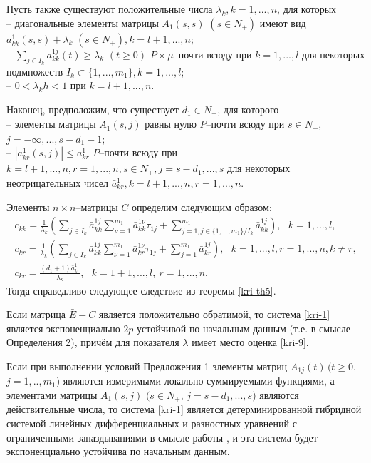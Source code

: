 Пусть также существуют положительные числа $\lambda _k, k = 1, ...,
n$, для которых\\
\noindent
-- диагональные элементы
матрицы $ A_1(s,s)$ $(s \in N_+)$ имеют вид $a_{kk}^{1}(s,s) +
\lambda _k \,\, (s \in N_+), k=l + 1, ..., n$;\\
--  $\sum \limits_{j\in I_k}a^{1j}_{kk}(t)
\geq \lambda _k \,\, (t\geq 0)$ $P\times\mu$--почти всюду при $k =
1,...,l$ для некоторых подмножеств $I_k \subset \{1,..., m_1\}, k =
1,..., l$;\\
-- $0 < \lambda _kh < 1$ при $ k
= l + 1, ..., n$.

Наконец, предположим, что существует $d_1 \in N_+$, для которого\\
\noindent
  -- элементы матрицы $A_1(s,j)$ равны нулю $P$--почти всюду
при $ s \in N_+$, $j=-\infty,...,s-d_1-1$;\\
--
$|a^1_{kr}(s,j)| \leq \bar a^1_{kr}$ $P$--почти всюду при $ k = l+1,
..., n, r = 1,...,n, s\in N_+, j=s-d_1,...,s $ для некоторых
неотрицательных чисел $\bar a^1_{kr},k = l+1, ..., n, r = 1,...,n$.

Элементы $n\times n$--матрицы $C$ определим следующим образом:
$$
\begin{array}{crl}
c_{kk} = \frac{1}{\lambda _k }\left(\sum \limits_{j \in I_k}\bar
a^{1j}_{kk}\sum \limits_{\nu=1}^{m_1}\bar a^{1\nu}_{kk} \tau _{1j} +
\sum \limits_{j=1, j \in \{1,...,m_1\}/ I_k}^{m_1} \bar
a^{1j}_{kk}\right), \ \ \ k = 1,...,l,\\
c_{kr} = \frac{1}{\lambda _k }\left(\sum \limits_{j \in I_k}\bar
a^{1j}_{kk}\sum \limits_{\nu=1}^{m_1}\bar a^{1\nu}_{kr}\tau _{1j} +
\sum \limits_{j=1}^{m_1} \bar a^{1j}_{kr}\right),\ \ \ k =
1,...,l,r = 1, ..., n, k \neq r,\\
 c_{kr} = \frac{(d_1+1)\bar a^{1}_{kr}}{\lambda_k}, \ \ \ k = 1 + 1,...,l, \
 r = 1,...,n.
\end {array}
$$
Тогда справедливо следующее следствие из теоремы \ref{kri-th5}.

\begin{proposition}\label{kri-prop1}
Если матрица $\bar E - C$ является
положительно обратимой, то система \eqref{kri-1} является экспоненциально
$2p$-устойчивой по начальным данным (т.е. в смысле Определения 2),
причём для показателя  $\lambda$ имеет место оценка \eqref{kri-9}.
\end{proposition}
\begin{remark}\label{kri-rem1}  Если при выполнении условий Предложения 1
элементы матриц $A_{1j} (t) \, (t \!\!\geq 0$, $j = 1,..,m_1$) являются
измеримыми локально суммируемыми функциями, а элементами матрицы
$A_1(s,j)\,\, (s \in N_+$, $j=s-d_1, ..., s)$ являются
действительные числа,  то система \eqref{kri-1} является детерминированной
гибридной системой линейных дифференциальных  и разностных уравнений
с ограниченными запаздываниями в смысле работы \cite{kri-5}, и эта
система будет экспоненциально устойчива по начальным данным.
\end{remark}

